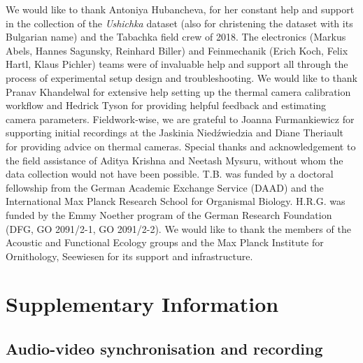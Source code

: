 \documentclass[
]{book}
\begin{document}
We would like to thank Antoniya Hubancheva, for her constant help and support in the collection of the \emph{Ushichka} dataset (also for christening the dataset with its Bulgarian name) and the Tabachka field crew of 2018. The electronics (Markus Abels, Hannes Sagunsky, Reinhard Biller) and Feinmechanik (Erich Koch, Felix Hartl, Klaus Pichler) teams were of invaluable help and support all through the process of experimental setup design and troubleshooting. We would like to thank Pranav Khandelwal for extensive help setting up the thermal camera calibration workflow and Hedrick Tyson for providing helpful feedback and estimating camera parameters. Fieldwork-wise, we are grateful to Joanna Furmankiewicz for supporting initial recordings at the Jaskinia Niedźwiedzia and Diane Theriault for providing advice on thermal cameras. Special thanks and acknowledgement to the field assistance of Aditya Krishna and Neetash Mysuru, without whom the data collection would not have been possible. T.B. was funded by a doctoral fellowship from the German Academic Exchange Service (DAAD) and the International Max Planck Research School for Organismal Biology. H.R.G. was funded by the Emmy Noether program of the German Research Foundation (DFG, GO 2091/2-1, GO 2091/2-2). We would like to thank the members of the Acoustic and Functional Ecology groups and the Max Planck Institute for Ornithology, Seewiesen for its support and infrastructure.

\hypertarget{ushichkasi}{%
\section{Supplementary Information}\label{ushichkasi}}

\hypertarget{ushichkaavmatch}{%
\subsection{Audio-video synchronisation and recording}\label{ushichkaavmatch}}
\end{document}
